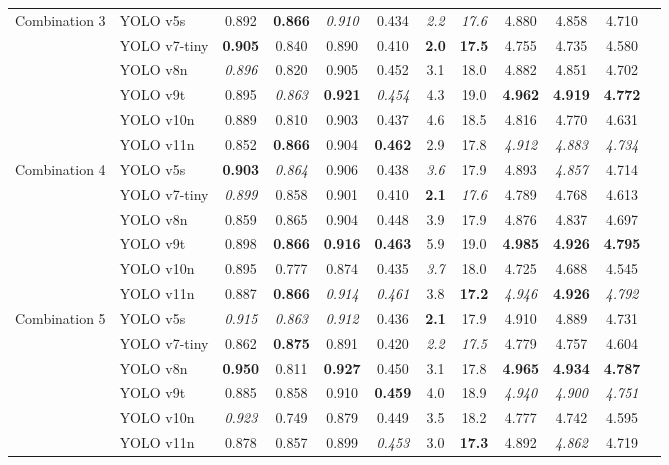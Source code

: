 \documentclass[runningheads]{llncs}
\begin{document}
\begin{table}[h!]
\begin{tabular}{@{}llcccccccccc@{}}
\midrule
\multirow{}{}{Combination 3}
& YOLO v5s 
& 0.892 & \textbf{0.866} & \textit{0.910} & 0.434 
& \textit{2.2} & \textit{17.6}
& 4.880 & 4.858 & 4.710 \\
& YOLO v7-tiny 
& \textbf{0.905} & 0.840 & 0.890 & 0.410 
& \textbf{2.0} & \textbf{17.5} 
& 4.755 & 4.735 & 4.580 \\
& YOLO v8n 
& \textit{0.896} & 0.820 & 0.905 & 0.452 
& 3.1 & 18.0 
& 4.882 & 4.851 & 4.702 \\
& YOLO v9t 
& 0.895 & \textit{0.863} & \textbf{0.921} & \textit{0.454} 
& 4.3 & 19.0 
& \textbf{4.962} & \textbf{4.919} & \cellcolor{secondblue}\textbf{4.772} \\
& YOLO v10n 
& 0.889 & 0.810 & 0.903 & 0.437 
& 4.6 & 18.5 
& 4.816 & 4.770 & 4.631 \\
& YOLO v11n 
& 0.852 & \textbf{0.866} & 0.904 & \textbf{0.462} 
& 2.9 & 17.8 
& \textit{4.912} & \textit{4.883} & \textit{4.734} \\



\midrule
\multirow{}{}{Combination 4}
& YOLO v5s 
& \textbf{0.903} & \textit{0.864} & 0.906 & 0.438 
& \textit{3.6} & 17.9 
& 4.893 & \textit{4.857} & 4.714 \\
& YOLO v7-tiny 
& \textit{0.899} & 0.858 & 0.901 & 0.410 
& \textbf{2.1} & \textit{17.6} 
& 4.789 & 4.768 & 4.613 \\
& YOLO v8n 
& 0.859 & 0.865 & 0.904 & 0.448 
& 3.9 & 17.9 
& 4.876 & 4.837 & 4.697 \\
& YOLO v9t 
& 0.898 & \textbf{0.866} & \textbf{0.916} & \textbf{0.463} 
& 5.9 & 19.0 
& \cellcolor{bestgreen}\textbf{4.985} & \cellcolor{secondblue}\textbf{4.926} & \cellcolor{bestgreen}\textbf{4.795} \\
& YOLO v10n 
& 0.895 & 0.777 & 0.874 & 0.435 
& \textit{3.7} & 18.0 
& 4.725 & 4.688 & 4.545 \\
& YOLO v11n 
& 0.887 & \textbf{0.866} & \textit{0.914} & \textit{0.461} 
& 3.8 & \textbf{17.2} 
& \textit{4.946} & \cellcolor{secondblue}\textbf{4.926} & \textit{4.792} \\



  \midrule
\multirow{}{}{Combination 5}
& YOLO v5s 
& \textit{0.915} & \textit{0.863} & \textit{0.912} & 0.436 
& \textbf{2.1} & 17.9 
& 4.910 & 4.889 & 4.731 \\
& YOLO v7-tiny 
& 0.862 & \textbf{0.875} & 0.891 & 0.420 
& \textit{2.2} & \textit{17.5} 
& 4.779 & 4.757 & 4.604 \\
& YOLO v8n 
& \textbf{0.950} & 0.811 & \textbf{0.927} & 0.450 
& 3.1 & 17.8 
& \cellcolor{secondblue}\textbf{4.965} & \cellcolor{bestgreen}\textbf{4.934} & \textbf{4.787} \\
& YOLO v9t 
& 0.885 & 0.858 & 0.910 & \textbf{0.459} 
& 4.0 & 18.9 
& \textit{4.940} & \textit{4.900} & \textit{4.751} \\
& YOLO v10n 
& \textit{0.923} & 0.749 & 0.879 & 0.449 
& 3.5 & 18.2 
& 4.777 & 4.742 & 4.595 \\
& YOLO v11n 
& 0.878 & 0.857 & 0.899 & \textit{0.453} 
& 3.0 & \textbf{17.3} 
& 4.892 & \textit{4.862} & 4.719 \\


\end{tabular}
\end{table}
\end{document}
